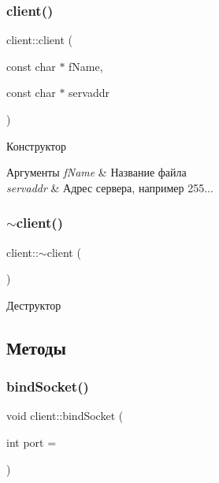 \subsubsection{\texorpdfstring{client()}{client()}}
{\footnotesize\ttfamily client\+::client (\begin{DoxyParamCaption}\item[{const char $\ast$}]{f\+Name,  }\item[{const char $\ast$}]{servaddr }\end{DoxyParamCaption})}



Конструктор 


\begin{DoxyParams}{Аргументы}
{\em f\+Name} & Название файла \\
\hline
{\em servaddr} & Адрес сервера, например 255... \\
\hline
\end{DoxyParams}
\mbox{\label{classclient_ad45e388579b8c0ffec6f29ed2c0c4de9}} 
\subsubsection{\texorpdfstring{$\sim$client()}{~client()}}
{\footnotesize\ttfamily client\+::$\sim$client (\begin{DoxyParamCaption}{ }\end{DoxyParamCaption})}



Деструктор 



\subsection{Методы}
\mbox{\label{classclient_a4bb044f07b5c114bc5ad015a1de6260b}} 
\subsubsection{\texorpdfstring{bind\+Socket()}{bindSocket()}}
{\footnotesize\ttfamily void client\+::bind\+Socket (\begin{DoxyParamCaption}\item[{int}]{port = {} }\end{DoxyParamCaption})\hspace{0.3cm}{\ttfamily [private]}}



